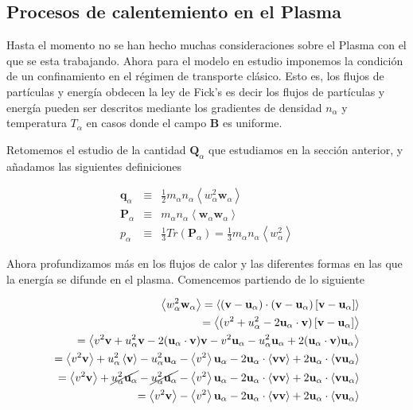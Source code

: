 \subsection{Procesos de calentemiento en el Plasma}

  Hasta el momento no se han hecho muchas consideraciones sobre el Plasma con el que se esta trabajando. Ahora para el modelo en estudio imponemos la condici\'on de un confinamiento en el r\'egimen de transporte cl\'asico. Esto es, los flujos de part\'iculas y energ\'ia obdecen la ley de Fick's es decir los flujos de part\'iculas y energ\'ia pueden ser descritos mediante los gradientes de densidad $n_\alpha$ y temperatura $T_\alpha$ en casos donde el campo $\textbf{B}$ es uniforme.

Retomemos el estudio de la cantidad $\textbf{Q}_\alpha$ que estudiamos en la secci\'on anterior, y añadamos las siguientes definiciones

  \begin{eqnarray}
    \textbf{q}_\alpha &\equiv& \frac{1}{2}m_\alpha n_\alpha\left<w_\alpha^2\textbf{w}_\alpha\right>\label{eq:q} \\
  \textbf{P}_\alpha &\equiv&  m_\alpha n_\alpha\left<\textbf{w}_\alpha\textbf{w}_\alpha\right>\label{eq:tensorP} \\
    p_\alpha &\equiv& \frac{1}{3}Tr(\textbf{P}_\alpha) = \frac{1}{3}m_\alpha n_\alpha\left<w_\alpha^2\right> \label{eq:pressureanisotropic}
  \end{eqnarray}

  Ahora profundizamos m\'as en los flujos de calor y las diferentes formas en las que la energ\'ia se difunde en el plasma. Comencemos partiendo de lo siguiente

  \begin{eqnarray*}
    \left<w_\alpha^2\textbf{w}_\alpha\right> = \left<(\textbf{v} - \textbf{u}_\alpha)\cdot(\textbf{v} - \textbf{u}_\alpha)\left[\textbf{v} - \textbf{u}_\alpha\right]\right> \\
    = \left<(v^2 + u_\alpha^2 - 2\textbf{u}_\alpha\cdot\textbf{v})\left[\textbf{v}-\textbf{u}_\alpha\right]\right> \\
    = \left< v^2\textbf{v} + u_\alpha^2\textbf{v} - 2(\textbf{u}_\alpha\cdot\textbf{v})\textbf{v} - v^2\textbf{u}_\alpha - u_\alpha^2\textbf{u}_\alpha + 2(\textbf{u}_\alpha\cdot\textbf{v})\textbf{u}_\alpha\right>\\
    = \left<v^2\textbf{v}\right> + u_\alpha^2\left<\textbf{v}\right> - u_\alpha^2\textbf{u}_\alpha - \left<v^2\right>\textbf{u}_\alpha - 2\textbf{u}_\alpha\cdot\left<\textbf{vv}\right> + 2\textbf{u}_\alpha\cdot\left<\textbf{vu}_\alpha\right>\\
  = \left<v^2\textbf{v}\right> + \cancel{u_\alpha^2\textbf{u}_\alpha} - \cancel{u_\alpha^2\textbf{u}_\alpha} - \left<v^2\right>\textbf{u}_\alpha - 2\textbf{u}_\alpha\cdot\left<\textbf{vv}\right> + 2\textbf{u}_\alpha\cdot\left<\textbf{vu}_\alpha\right>\\
    = \left<v^2\textbf{v}\right> -\left<v^2\right>\textbf{u}_\alpha - 2\textbf{u}_\alpha\cdot\left<\textbf{vv}\right> + 2\textbf{u}_\alpha\cdot\left<\textbf{vu}_\alpha\right>
  \end{eqnarray*}

